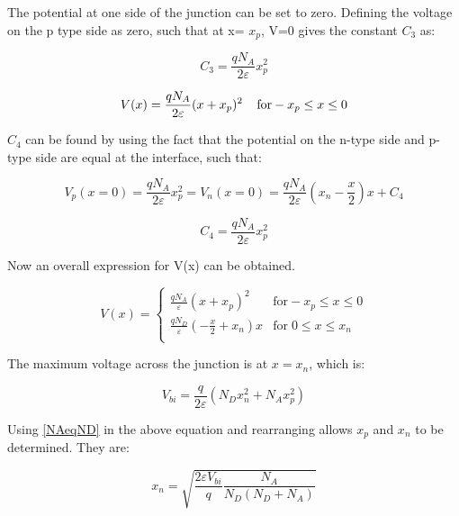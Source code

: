 \begin{doublespace}
The potential at one side of the junction can be set to zero. Defining the voltage on the p type side as zero, such that at x= $x_p$, V=0 gives the constant $C_3$ as:

\begin{equation}
C_{3}=\frac{qN_{A}}{2\varepsilon}x_{p}^{2}
\end{equation}

\begin{equation}
V(x)=\frac{qN_{A}}{2\varepsilon}(x+x_{p})^{2}  \; \; \;\;  \text{for}  -x_{p}\leq x \leq 0 \\
\end{equation}

$C_4$ can be found by using the fact that the potential on the n-type side and p-type side are equal at the interface, such that:

\begin{equation}
V_{p}(x=0)=\frac{qN_{A}}{2\varepsilon}x_{p}^2=V_{n}(x=0)=\frac{qN_{A}}{2\varepsilon}(x_{n}-\frac{x}{2})x+C_{4}
\end{equation}

\begin{equation}
C_{4}=\frac{qN_{A}}{2\varepsilon}x_{p}^2
\end{equation}

Now an overall expression for V(x) can be obtained.

\begin{equation}
V(x) = \begin{cases}
       \frac{qN_{A}}{\varepsilon}(x+x_{p})^2 & \text{for}  -x_{p}\leq x \leq 0 \\
       \frac{qN_{D}}{\varepsilon}(-\frac{x}{2}+x_{n})x  &  \text{for} \; 0 \leq x \leq x_{n}  \\
     \end{cases}
\end{equation}

The maximum voltage across the junction is at  $x= x_{n}$, which is:

\begin{equation}
V_{bi}=\frac{q}{2\varepsilon}(N_{D}x_{n}^2+N_{A}x_{p}^2)
\end{equation}

Using \eqref{NAeqND} in the above equation and rearranging allows $x_{p}$ and $x_{n}$ to be determined. They are:

\begin{equation}
x_{n}=\sqrt{\frac{2\varepsilon V_{bi}}{q}\frac{N_{A}}{N_{D}(N_{D}+N_{A})}}
\end{equation}


\end{doublespace}
